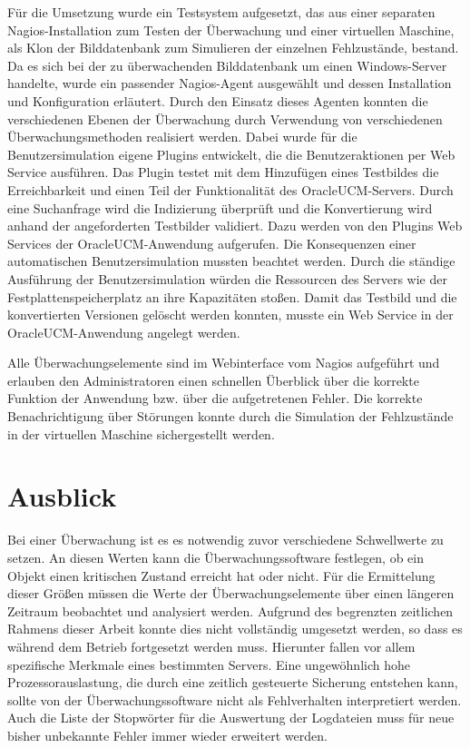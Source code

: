 Für die Umsetzung wurde ein Testsystem aufgesetzt, das aus einer separaten Nagios-Installation zum Testen der Überwachung und einer virtuellen Maschine, als Klon der Bilddatenbank zum Simulieren der einzelnen Fehlzustände, bestand.
Da es sich bei der zu überwachenden Bilddatenbank um einen Windows-Server handelte, wurde ein passender Nagios-Agent ausgewählt und dessen Installation und Konfiguration erläutert.
Durch den Einsatz dieses Agenten konnten die verschiedenen Ebenen der Überwachung durch Verwendung von verschiedenen Überwachungsmethoden realisiert werden.
Dabei wurde für die Benutzersimulation eigene Plugins entwickelt, die die Benutzeraktionen per Web Service ausführen.
Das Plugin testet mit dem Hinzufügen eines Testbildes die Erreichbarkeit und einen Teil der Funktionalität des \gls{OracleUCM}-Servers.
Durch eine Suchanfrage wird die Indizierung überprüft und die Konvertierung wird anhand der angeforderten Testbilder validiert.
Dazu werden von den Plugins Web Services der \gls{OracleUCM}-Anwendung aufgerufen.
Die Konsequenzen einer automatischen Benutzersimulation mussten beachtet werden.
Durch die ständige Ausführung der Benutzersimulation würden die Ressourcen des Servers wie der Festplattenspeicherplatz an ihre Kapazitäten stoßen.
Damit das Testbild und die konvertierten Versionen gelöscht werden konnten, musste ein Web Service in der \gls{OracleUCM}-Anwendung angelegt werden.

Alle Überwachungselemente sind im Webinterface vom Nagios aufgeführt und erlauben den Administratoren einen schnellen Überblick über die korrekte Funktion der Anwendung bzw. über die aufgetretenen Fehler.
Die korrekte Benachrichtigung über Störungen konnte durch die Simulation der Fehlzustände in der virtuellen Maschine sichergestellt werden.
\newpage
\section{Ausblick}
Bei einer Überwachung ist es es notwendig zuvor verschiedene Schwellwerte zu setzen.
An diesen Werten kann die Überwachungssoftware festlegen, ob ein Objekt einen kritischen Zustand erreicht hat oder nicht.
Für die Ermittelung dieser Größen müssen die Werte der Überwachungselemente über einen längeren Zeitraum beobachtet und analysiert werden.
Aufgrund des begrenzten zeitlichen Rahmens dieser Arbeit konnte dies nicht vollständig umgesetzt werden, so dass es während dem Betrieb fortgesetzt werden muss.
Hierunter fallen vor allem spezifische Merkmale eines bestimmten Servers.
Eine ungewöhnlich hohe Prozessorauslastung, die durch eine zeitlich gesteuerte Sicherung entstehen kann, sollte von der Überwachungssoftware nicht als Fehlverhalten interpretiert werden.
Auch die Liste der Stopwörter für die Auswertung der Logdateien muss für neue bisher unbekannte Fehler immer wieder erweitert werden.

